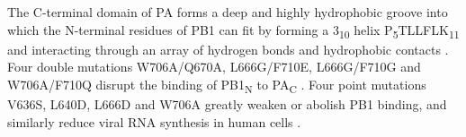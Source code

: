 The C-terminal domain of PA forms a deep and highly hydrophobic groove into which the N-terminal residues of PB1 can fit by forming a 3\textsubscript{10} helix P\textsubscript{5}TLLFLK\textsubscript{11} and interacting through an array of hydrogen bonds and hydrophobic contacts \citep{1141}. Four double mutations W706A/Q670A, L666G/F710E, L666G/F710G and W706A/F710Q disrupt the binding of PB1\textsubscript{N} to PA\textsubscript{C} \citep{1540}. Four point mutations V636S, L640D, L666D and W706A greatly weaken or abolish PB1 binding, and similarly reduce viral RNA synthesis in human cells \citep{1141}.%

